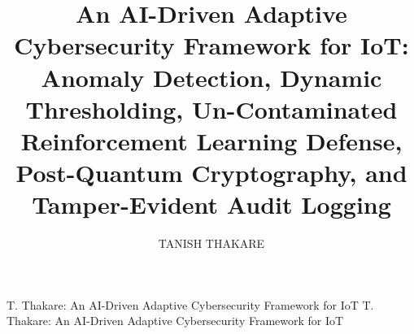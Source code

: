 \documentclass{ieeeaccess}
\begin{document}
\doi{}

\title{An AI-Driven Adaptive Cybersecurity Framework for IoT: Anomaly Detection, Dynamic Thresholding, Un-Contaminated Reinforcement Learning Defense, Post-Quantum Cryptography, and Tamper-Evident Audit Logging}

\author{\uppercase{Tanish Thakare}}

\address[1]{Department of Computer Science and Engineering, Independent Research (e-mail: tanish.thakare2005@gmail.com)}


\markboth
{T. Thakare: An AI-Driven Adaptive Cybersecurity Framework for IoT}
{T. Thakare: An AI-Driven Adaptive Cybersecurity Framework for IoT}

\end{document}
